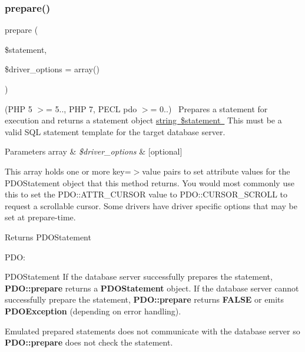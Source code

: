 \subsubsection{\texorpdfstring{prepare()}{prepare()}}
{\footnotesize\ttfamily prepare (\begin{DoxyParamCaption}\item[{}]{\$statement,  }\item[{}]{\$driver\+\_\+options = {\ttfamily array()} }\end{DoxyParamCaption})}

(P\+HP 5 $>$= 5.., P\+HP 7, P\+E\+CL pdo $>$= 0..)~\newline
 Prepares a statement for execution and returns a statement object \mbox{\hyperlink{}{string \$statement }} This must be a valid S\+QL statement template for the target database server. 


\begin{DoxyParams}[1]{Parameters}
array & {\em \$driver\+\_\+options} & \mbox{[}optional\mbox{]} \\
\hline
\end{DoxyParams}
This array holds one or more key=$>$value pairs to set attribute values for the P\+D\+O\+Statement object that this method returns. You would most commonly use this to set the P\+D\+O\+::\+A\+T\+T\+R\+\_\+\+C\+U\+R\+S\+OR value to P\+D\+O\+::\+C\+U\+R\+S\+O\+R\+\_\+\+S\+C\+R\+O\+LL to request a scrollable cursor. Some drivers have driver specific options that may be set at prepare-\/time. 

\begin{DoxyReturn}{Returns}
P\+D\+O\+Statement
\begin{DoxyItemize}
\item P\+DO\+: 
\end{DoxyItemize}

P\+D\+O\+Statement If the database server successfully prepares the statement, {\bfseries P\+D\+O\+::prepare} returns a {\bfseries P\+D\+O\+Statement} object. If the database server cannot successfully prepare the statement, {\bfseries P\+D\+O\+::prepare} returns {\bfseries F\+A\+L\+SE} or emits {\bfseries P\+D\+O\+Exception} (depending on error handling). 
\end{DoxyReturn}


Emulated prepared statements does not communicate with the database server so {\bfseries P\+D\+O\+::prepare} does not check the statement. \mbox{\label{interface_pes_1_1_database_1_1_handler_1_1_mini_1_1_p_d_o_interface_a8dbd35d765e8ff0d1c34461ef67c5abf}} 
